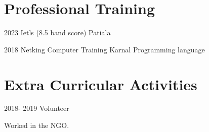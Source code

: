 \documentclass[]{cv-style} %
\begin{document}
\section{Professional Training}
\begin{entrylist}
\entry
{2023}
{Ietls (8.5 band score)}
{Patiala}

\entry
{2018}
{Netking Computer Training}
{Karnal}
{Programming language}
\end{entrylist}
\section{Extra Curricular Activities}
\begin{entrylist}
\entry
{2018- 2019}
{Volunteer}

{Worked in the NGO.}
\end{entrylist}
\end{document}
